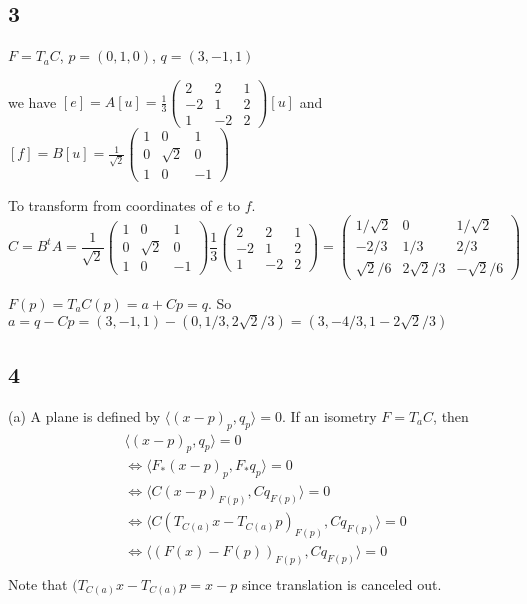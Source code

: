 \documentclass[12pt]{article}
\begin{document}
\subsection*{3}
$F = T_a C$,  $p=(0, 1, 0)$, $q=(3, -1, 1)$

we have $[e] = A[u] =  \frac{1}{3}\begin{pmatrix}
	2 & 2 & 1 \\-2 & 1 & 2 \\ 1 & -2 & 2 
\end{pmatrix} [u]$ and   $[f] = B[u] =  \frac{1}{\sqrt{2}} \begin{pmatrix}
1 & 0 & 1 \\ 0 & \sqrt{2} & 0 \\ 1 & 0 & -1
\end{pmatrix} $

To transform from coordinates of $e$ to $f$.
$$C = B^tA =  \frac{1}{\sqrt{2}} \begin{pmatrix}
	1 & 0 & 1 \\ 0 & \sqrt{2} & 0 \\ 1 & 0 & -1
\end{pmatrix} \frac{1}{3}\begin{pmatrix}
2 & 2 & 1 \\-2 & 1 & 2 \\ 1 & -2 & 2 
\end{pmatrix} = \begin{pmatrix}
1 / \sqrt{2} & 0 & 1 /\sqrt{2} \\  -2 /3 & 1/3 & 2/3 \\  \sqrt{2}/6 &  2\sqrt{2}/3  & - \sqrt{2}/6
\end{pmatrix}$$

$F(p) = T_a C (p) = a + Cp =  q$.  So $ a = q - Cp = (3, -1, 1) - (0, 1/3 , 2\sqrt{2}/3) = (3, -4/3, 1 - 2\sqrt{2}/3) $

\subsection*{4}
(a)
A plane is defined by $\langle (x - p)_p , q_p \rangle = 0$. If an isometry $F=T_aC$, 
then $$
 \begin{aligned}
 	& \langle (x - p)_p , q_p \rangle = 0 \\
 	&\Leftrightarrow \langle F_* (x - p)_p ,  F_* q_p \rangle = 0 \\
 	&\Leftrightarrow \langle C (x - p)_{F(p)} ,  Cq_{F(p)}  \rangle = 0 \\
 	&\Leftrightarrow \langle C(T_{C(a)}x - T_{C(a)}p) _{F(p)} ,  Cq_{F(p)}  \rangle = 0 \\
 	&\Leftrightarrow \langle (F(x) - F(p))_{F(p)} ,  Cq_{F(p)}  \rangle = 0 \\
 \end{aligned}
$$
Note that $(T_{C(a)}x - T_{C(a)}p = x - p$ since translation is canceled out. \QED
\end{document}
